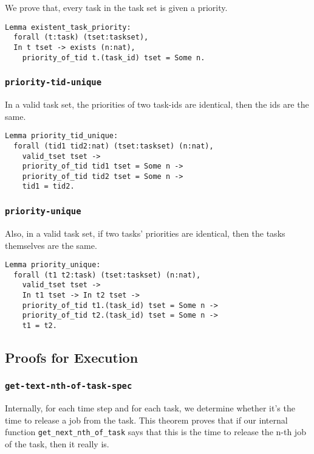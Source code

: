 \documentclass[nocopyrightspace]{sigplanconf}
\begin{document}
We prove that, every task in the task set is given a priority.

\begin{verbatim}
Lemma existent_task_priority:
  forall (t:task) (tset:taskset),
  In t tset -> exists (n:nat),
    priority_of_tid t.(task_id) tset = Some n.
\end{verbatim}


\subsubsection{\texttt{priority-tid-unique}}

In a valid task set, the priorities of two task-ids are identical, then the ids are the same.

\begin{verbatim}
Lemma priority_tid_unique:
  forall (tid1 tid2:nat) (tset:taskset) (n:nat),
    valid_tset tset ->
    priority_of_tid tid1 tset = Some n ->
    priority_of_tid tid2 tset = Some n ->
    tid1 = tid2.
\end{verbatim}

\subsubsection{\texttt{priority-unique}}

Also, in a valid task set, if two tasks' priorities are identical, then the tasks themselves are the same.

\begin{verbatim}
Lemma priority_unique:
  forall (t1 t2:task) (tset:taskset) (n:nat),
    valid_tset tset ->
    In t1 tset -> In t2 tset ->
    priority_of_tid t1.(task_id) tset = Some n ->
    priority_of_tid t2.(task_id) tset = Some n ->
    t1 = t2.
\end{verbatim}

\subsection{Proofs for Execution}

\subsubsection{\texttt{get-text-nth-of-task-spec}}

Internally, for each time step and for each task, we determine whether it's the time to release a job
from the task. This theorem proves that if our internal function \texttt{get\_next\_nth\_of\_task}
says that this is the time to release the n-th job of the task, then it really is.
\end{document}

